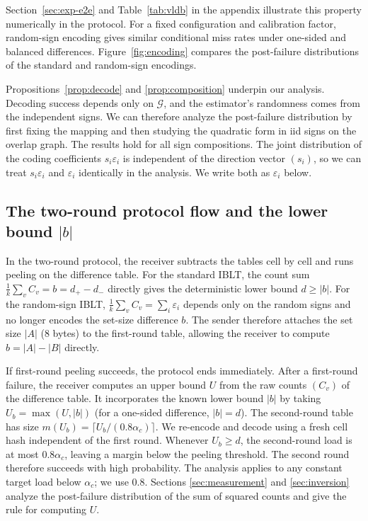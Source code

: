 Section~\ref{sec:exp-e2e} and Table~\ref{tab:vldb} in the appendix illustrate this property numerically in the protocol. For a fixed configuration and calibration factor, random-sign encoding gives similar conditional miss rates under one-sided and balanced differences. Figure~\ref{fig:encoding} compares the post-failure distributions of the standard and random-sign encodings.

Propositions~\ref{prop:decode} and \ref{prop:composition} underpin our analysis. Decoding success depends only on $\mathcal G$, and the estimator's randomness comes from the independent signs. We can therefore analyze the post-failure distribution by first fixing the mapping and then studying the quadratic form in iid signs on the overlap graph. The results hold for all sign compositions. The joint distribution of the coding coefficients $s_i\varepsilon_i$ is independent of the direction vector $(s_i)$, so we can treat $s_i\varepsilon_i$ and $\varepsilon_i$ identically in the analysis. We write both as $\varepsilon_i$ below.

\subsection{\texorpdfstring{The two-round protocol flow and the lower bound $|b|$}{The two-round protocol flow and the lower bound |b|}}\label{sec:flow}
In the two-round protocol, the receiver subtracts the tables cell by cell and runs peeling on the difference table. For the standard IBLT, the count sum $\frac1k\sum_vC_v=b=d_+-d_-$ directly gives the deterministic lower bound $d\ge|b|$. For the random-sign IBLT, $\frac1k\sum_vC_v=\sum_i\varepsilon_i$ depends only on the random signs and no longer encodes the set-size difference $b$. The sender therefore attaches the set size $|A|$ (8 bytes) to the first-round table, allowing the receiver to compute $b=|A|-|B|$ directly.

If first-round peeling succeeds, the protocol ends immediately. After a first-round failure, the receiver computes an upper bound $U$ from the raw counts $(C_v)$ of the difference table. It incorporates the known lower bound $|b|$ by taking $U_b=\max(U,|b|)$ (for a one-sided difference, $|b|=d$). The second-round table has size $m(U_b)=\lceil U_b/(0.8\alpha_c)\rceil$. We re-encode and decode using a fresh cell hash independent of the first round. Whenever $U_b\ge d$, the second-round load is at most $0.8\alpha_c$, leaving a margin below the peeling threshold. The second round therefore succeeds with high probability. The analysis applies to any constant target load below $\alpha_c$; we use 0.8. Sections \ref{sec:measurement} and \ref{sec:inversion} analyze the post-failure distribution of the sum of squared counts and give the rule for computing $U$.
